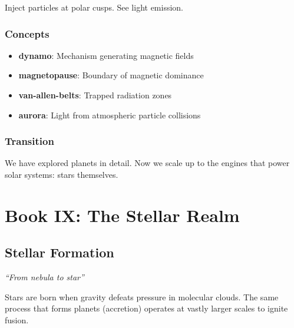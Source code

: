 \documentclass[
  11pt,
  letterpaper,
  twoside,
  openright]{book}
\providecommand{\tightlist}{%
  \setlength{\itemsep}{0pt}\setlength{\parskip}{0pt}}
\begin{document}
Inject particles at polar cusps. See light emission.

\section{Concepts}\label{concepts-18}

\begin{itemize}
\tightlist
\item
  \textbf{dynamo}: Mechanism generating magnetic fields
\item
  \textbf{magnetopause}: Boundary of magnetic dominance
\item
  \textbf{van-allen-belts}: Trapped radiation zones
\item
  \textbf{aurora}: Light from atmospheric particle collisions
\end{itemize}

\section{Transition}\label{transition-18}

We have explored planets in detail. Now we scale up to the engines that
power solar systems: stars themselves.

\part{Book IX: The Stellar Realm}

\chapter{Stellar Formation}\label{sec-stellar-formation}

\emph{``From nebula to star''}

\begin{tcolorbox}[enhanced jigsaw, coltitle=black, colbacktitle=quarto-callout-note-color!10!white, toprule=.15mm, colframe=quarto-callout-note-color-frame, arc=.35mm, opacityback=0, bottomtitle=1mm, toptitle=1mm, breakable, colback=white, titlerule=0mm, opacitybacktitle=0.6, title=\textcolor{quarto-callout-note-color}{\faInfo}\hspace{0.5em}{Key Revelation}, rightrule=.15mm, bottomrule=.15mm, leftrule=.75mm, left=2mm]

Stars are born when gravity defeats pressure in molecular clouds. The
same process that forms planets (accretion) operates at vastly larger
scales to ignite fusion.

\end{tcolorbox}
\end{document}
